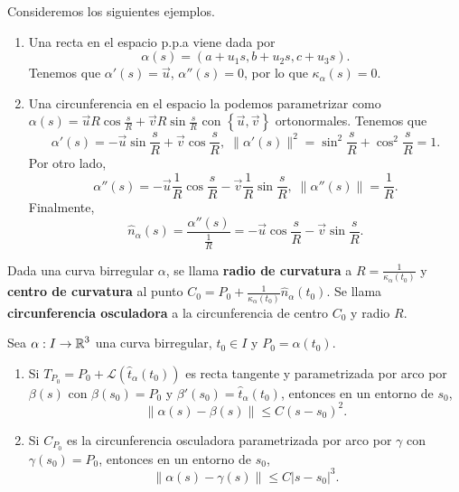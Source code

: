 \begin{eg} Consideremos los siguientes ejemplos.
\begin{enumerate}
\item Una recta en el espacio p.p.a viene dada por 
	\[\alpha\left(s\right)=\left(a + u_{1}s, b + u_{2}s, c+u_{3}s\right) .\]
	Tenemos que $\displaystyle \alpha'\left(s\right)=\vec{u} $, $\displaystyle \alpha''\left(s\right)=0 $, por lo que $\displaystyle \kappa_{\alpha }\left(s\right)=0 $. 
\item Una circunferencia en el espacio la podemos parametrizar como $\displaystyle \alpha\left(s\right)=\vec{u}R\cos\frac{s}{R}+\vec{v}R\sin\frac{s}{R} $ con $\displaystyle \left\{ \vec{u}, \vec{v}\right\}  $ ortonormales. Tenemos que 
	\[\alpha'\left(s\right)=-\vec{u}\sin\frac{s}{R} + \vec{v}\cos\frac{s}{R}, \; \|\alpha'\left(s\right)\|^{2}= \sin ^{2}\frac{s}{R} + \cos^{2}\frac{s}{R} = 1 .\]
	Por otro lado, 
	\[\alpha''\left(s\right)=-\vec{u}\frac{1}{R}\cos\frac{s}{R}-\vec{v}\frac{1}{R}\sin \frac{s}{R}, \; \|\alpha''\left(s\right)\| = \frac{1}{R} .\]
Finalmente, 
\[\hat{n}_{\alpha }\left(s\right)=\frac{\alpha''\left(s\right)}{\frac{1}{R}}= - \vec{u}\cos \frac{s}{R}-\vec{v}\sin \frac{s}{R} .\]
\end{enumerate}
\end{eg}

\begin{definition}
Dada una curva birregular $\displaystyle \alpha  $, se llama \textbf{radio de curvatura} a $\displaystyle R = \frac{1}{\kappa_{\alpha }\left(t_{0}\right)} $ y \textbf{centro de curvatura} al punto $\displaystyle C_{0} = P_{0} + \frac{1}{\kappa_{\alpha }\left(t_{0}\right)}\hat{n}_{\alpha }\left(t_{0}\right) $. Se llama \textbf{circunferencia osculadora} a la circunferencia de centro $\displaystyle C_{0} $ y radio $\displaystyle R $. 
\end{definition}
\begin{prop} Sea $\displaystyle \alpha : I \to \mathbb{R}^{3} $ una curva birregular, $\displaystyle t_{0} \in I $ y $\displaystyle P_{0}= \alpha\left(t_{0}\right) $.
\begin{enumerate} 
\item Si $\displaystyle T_{P_{0}}=P_{0} + \mathcal{L}\left(\hat{t}_{\alpha }\left(t_{0}\right)\right) $ es recta tangente y parametrizada por arco por $\displaystyle \beta\left(s\right) $ con $\displaystyle \beta\left(s_{0}\right)=P_{0} $ y $\displaystyle \beta'\left(s_{0}\right)=\hat{t}_{\alpha }\left(t_{0}\right) $, entonces en un entorno de $\displaystyle s_{0} $,
	\[\|\alpha\left(s\right)-\beta\left(s\right)\|\leq C\left(s-s_{0}\right)^{2} .\]
\item Si $\displaystyle C_{P_{0}} $ es la circunferencia osculadora parametrizada por arco por $\displaystyle \gamma  $ con $\displaystyle \gamma\left(s_{0}\right)=P_{0} $, entonces en un entorno de $\displaystyle s_{0} $,
	\[\|\alpha\left(s\right)-\gamma\left(s\right)\|\leq C\left|s-s_{0}\right|^{3} .\]
\end{enumerate}
\end{prop}


